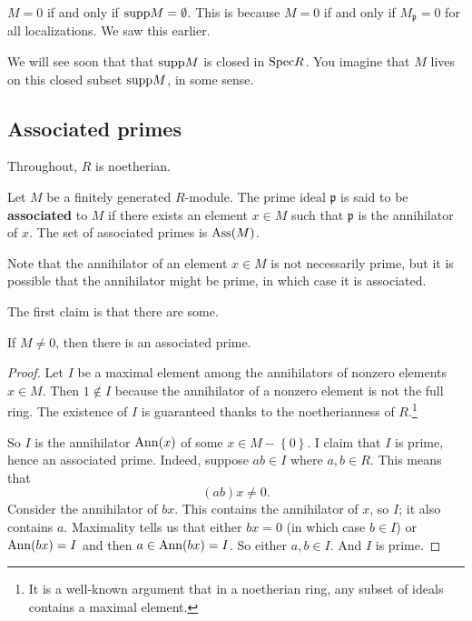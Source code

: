 \begin{remark} 
$M = 0$ if and only if $\mathrm{supp} M = \emptyset$. This is because $M= 0$ if and
only if $M_{\mathfrak{p}} = 0$ for all localizations.  We saw this earlier.
\end{remark} 

We will see soon that that $\mathrm{supp} M$ is closed in $\mathrm{Spec} R$. You imagine that
$M$ lives on this closed subset $\mathrm{supp} M$, in some sense.



\subsection{Associated primes}
Throughout, $R$ is noetherian.

\begin{definition} 
Let $M$ be a finitely generated $R$-module.  The prime ideal $\mathfrak{p}$ is said to be
\textbf{associated} to $M$ if there exists an element $x \in M$ such that
$\mathfrak{p}$ is the annihilator of $x$.  The set of associated primes is
$\mathrm{Ass}(M)$.
\end{definition} 

Note that the annihilator of an element $x \in M$ is not necessarily prime, but
it is possible that the annihilator might be prime, in which case it is
associated.

The first claim is that there are some.
\begin{proposition} 
If $M \neq 0$, then there is an associated prime.
\end{proposition} 
\begin{proof} 
Let $I$ be a maximal element among the annihilators of nonzero elements $x \in M$. 
Then $1 \notin I$ because the annihilator of a nonzero element is not the full
ring. The existence of $I$ is guaranteed thanks to the noetherianness of
$R$.\footnote{It is a well-known argument that in a noetherian ring, any subset
of ideals contains a maximal element.}

So $I$ is the annihilator $\mathrm{Ann}(x)$ of some $x \in M - \left\{0\right\}$. I claim that
$I$ is prime, hence an associated prime.  
Indeed, suppose $ab \in I$ where $a,b \in R$. This means that
\[ (ab)x \neq 0.  \]
Consider the annihilator of $bx$. This contains the annihilator of $x$, so $I$;
it also contains $a$. Maximality tells us that either $bx = 0$ (in which case
$b \in I$) or $\mathrm{Ann}(bx) = I$ and  then $a \in \mathrm{Ann}(bx) = I$. So either $a,b \in I$.
And $I$ is prime. 
\end{proof} 


